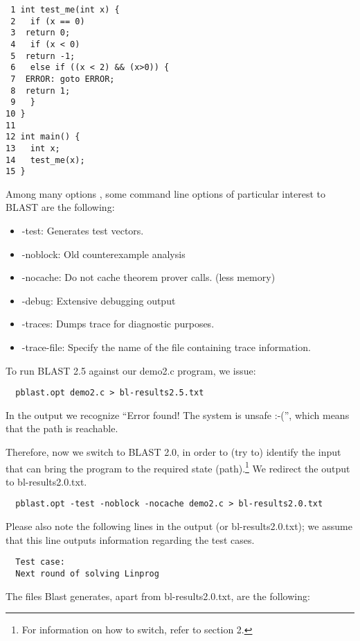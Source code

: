 \documentclass[a4paper, 11pt,twoside]{article}
\begin{document}
\begin{verbatim} 
 1 int test_me(int x) {
 2   if (x == 0)
 3 	return 0;
 4   if (x < 0)
 5 	return -1;
 6   else if ((x < 2) && (x>0)) {
 7 	ERROR: goto ERROR;
 8 	return 1;
 9   }
10 }
11
12 int main() {
13   int x;
14   test_me(x);
15 }
\end{verbatim}

Among many options \cite{BlaOp}, some command line options of particular interest to BLAST are the following:

\begin{itemize}
  \item -test: Generates test vectors.
  \item -noblock: Old counterexample analysis
  \item -nocache: Do not cache theorem prover calls. (less memory)
  \item -debug: Extensive debugging output
  \item -traces: Dumps trace for diagnostic purposes.
  \item -trace-file: Specify the name of the file containing trace information.
\end{itemize}

To run BLAST 2.5 against our demo2.c program, we issue:

\begin{verbatim} 
  pblast.opt demo2.c > bl-results2.5.txt
\end{verbatim}

In the output we recognize ``Error found! The system is unsafe :-('', which means that the path is reachable.

Therefore, now we switch to BLAST 2.0, in order to (try to) identify the input that can bring the program to the required state (path).\footnote{For information on how to switch, refer to section 2.} We redirect the output to bl-results2.0.txt.

\begin{verbatim} 
  pblast.opt -test -noblock -nocache demo2.c > bl-results2.0.txt
\end{verbatim}

Please also note the following lines in the output (or bl-results2.0.txt); we assume that this line outputs information regarding the test cases.

\begin{verbatim} 
  Test case:
  Next round of solving Linprog
\end{verbatim}

The files Blast generates, apart from bl-results2.0.txt, are the following:
\end{document}
